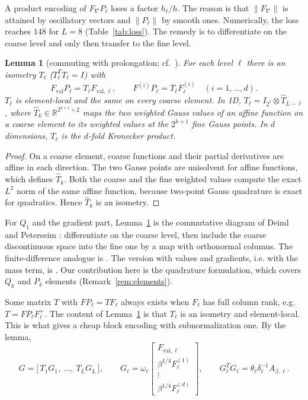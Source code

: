 \documentclass[11pt,a4paper]{article}
\newcommand{\R}{\mathbb{R}}
\newtheorem{lemma}[theorem]{Lemma}
\theoremstyle{remark}
\begin{document}
A product encoding of $F_\nabla P_\ell$ loses a factor $h_\ell/h$. The reason is
that $\|F_\nabla\|$ is attained by oscillatory vectors and $\|P_\ell\|$ by smooth
ones. Numerically, the loss reaches $148$ for $L=8$ (Table~\ref{tab:loss}).
The remedy is to differentiate on the coarse level and only then transfer
to the fine level.

\begin{lemma}[commuting with prolongation; cf.\ {\cite[Thm.~6.2]{DP26}}]\label{lem:commute}
For each level $\ell$ there is an isometry $T_\ell$ ($T_\ell^TT_\ell=I$) with
\[
F_{\mathrm{val}}P_\ell=T_\ell F_{\mathrm{val},\ell},\qquad F^{(i)}P_\ell=T_\ell F^{(i)}_\ell\quad(i=1,\dots,d).
\]
$T_\ell$ is element-local and the same on every coarse element. In 1D,
$T_\ell=I_{2^\ell}\otimes\widehat T_{L-\ell}$, where $\widehat T_k\in\R^{2^{k+1}\times2}$ maps the two
weighted Gauss values of an affine function on a coarse element to its
weighted values at the $2^{k+1}$ fine Gauss points. In $d$ dimensions,
$T_\ell$ is the $d$-fold Kronecker product.
\end{lemma}
\begin{proof}
On a coarse element, coarse functions and their partial derivatives are
affine in each direction. The two Gauss points are unisolvent for affine
functions, which defines $\widehat T_k$. Both the coarse and the fine weighted
values compute the exact $L^2$ norm of the same affine function, because
two-point Gauss quadrature is exact for quadratics. Hence $\widehat T_k$ is an
isometry.
\end{proof}

For $Q_1$ and the gradient part, Lemma~\ref{lem:commute} is the commutative
diagram of Deiml and Peterseim \cite[Thm.~6.2]{DP26}: differentiate on the
coarse level, then include the coarse discontinuous space into the fine one
by a map with orthonormal columns. The finite-difference analogue is
\cite[Lemma~4.3]{JLMY25}. The version with values and gradients, i.e. with
the mass term, is \cite[Lemma~3.3]{YYZ26}. Our contribution here is the
quadrature formulation, which covers $Q_k$ and $P_k$ elements
(Remark~\ref{rem:elements}).

Some matrix $T$ with $F P_\ell=TF_\ell$ always exists when $F_\ell$ has full column
rank, e.g. $T=FP_\ell F_\ell^+$. The content of Lemma~\ref{lem:commute} is that
$T_\ell$ is an isometry and element-local. This is what gives a cheap block
encoding with subnormalization one. By the lemma,
\begin{equation}\label{eq:Gsum}
G=\big[\,T_1G_1,\ \dots,\ T_LG_L\,\big],\qquad
G_\ell=\omega_\ell\begin{bmatrix}F_{\mathrm{val},\ell}\\ \beta^{1/4}F^{(1)}_\ell\\ \vdots\\ \beta^{1/4}F^{(d)}_\ell\end{bmatrix},\qquad
G_\ell^TG_\ell=\theta_\ell\delta_\ell^{-1}A_{\beta,\ell} .
\end{equation}
\end{document}

